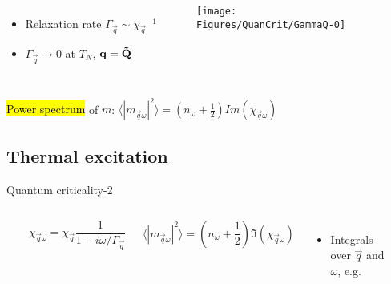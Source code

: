 {\begin{frame}[label=quancrit1]
\begin{columns}[t]
\begin{itemize}
\item Relaxation rate $\Gamma_\vec q \sim {\chi_\vec q}^{-1}$
\item $\Gamma_\vec q \rightarrow 0$ at $T_N$, $\bf q=\vec Q$
\end{itemize}

\centerline{~}
\texttt{[image: \\Figures/QuanCrit/GammaQ-0]}
\end{columns}

\vspace{4ex}
\centerline{\hl{Power spectrum} of $m$:
$\langle |m_{\vec q\omega}|^2 \rangle = \left(n_\omega + \frac{1}{2}\right) Im(\chi_{\vec q \omega})$}

\end{frame}


\subsection{Thermal excitation}
\begin{frame}[label=quancrit2]{Quantum criticality-2}

\begin{columns}[t]
  \centerline{~}
  \[ \chi_{\vec q \omega} = \chi_{\vec q} \frac{1}{1-i\omega/\Gamma_\vec q} \]

  \[ \langle |m_{\vec q\omega}|^2 \rangle = \left(n_\omega + \frac{1}{2}\right) \Im(\chi_{\vec q \omega}) \]

\begin{itemize}
\item<2->
  Integrals over $\vec q$ and $\omega$, e.g.
\end{itemize}

  \centerline{~}

\end{columns}


\end{frame}}
